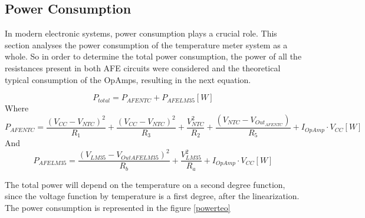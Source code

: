 \documentclass[12pt]{article}
\begin{document}
\subsection{Power Consumption}

    In modern electronic systems, power consumption plays a crucial role. This section analyses the power consumption of the temperature meter system as a whole. So in order to determine the total power consumption, the power of all the resistances present in both AFE circuits were considered and the theoretical typical consumption of the OpAmps, resulting in the next equation.
    
    \begin{equation}
        P_{total} =  P_{AFENTC} + P_{AFELM35}[W] 
    \end{equation}
    Where
    \begin{equation}
        P_{AFENTC} = \frac{(V_{CC} - V_{NTC})^2}{R_1} + \frac{(V_{CC} - V_{NTC})^2}{R_3} + \frac{V_{NTC}^2}{R_2} + \frac{(V_{NTC} - V_{Out_{AFENTC}})}{R_5} + I_{OpAmp} \cdot V_{CC} [W]
    \end{equation}
    And
    \begin{equation}
        P_{AFELM35} = \frac{(V_{LM35} - V_{Out{AFELM35}})^2}{R_b} + \frac{V_{LM35}^2}{R_a} + I_{OpAmp} \cdot V_{CC} [W]
    \end{equation}
    
    The total power will depend on the temperature on a second degree function, since the voltage function by temperature is a first degree, after the linearization.
    The power consumption is represented in the figure \ref{powerteo}
\end{document}
